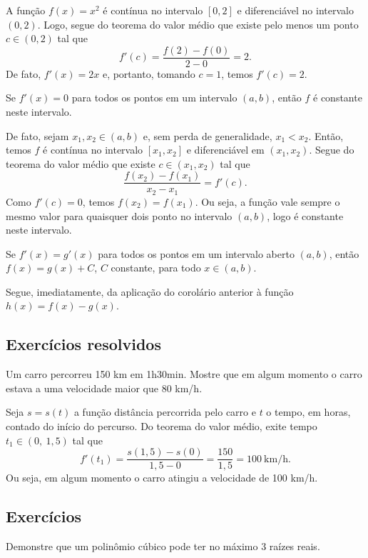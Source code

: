 \begin{ex}
  A função $f(x)=x^2$ é contínua no intervalo $[0,2]$ e diferenciável no intervalo $(0,2)$. Logo, segue do teorema do valor médio que existe pelo menos um ponto $c\in (0,2)$ tal que
  \begin{equation}
    f'(c)=\frac{f(2)-f(0)}{2-0}=2.
  \end{equation}
  De fato, $f'(x)=2x$ e, portanto, tomando $c=1$, temos $f'(c)=2$.
\end{ex}

\begin{corol}
  Se $f'(x)=0$ para todos os pontos em um intervalo $(a, b)$, então $f$ é constante neste intervalo.
\end{corol}
\begin{dem}
  De fato, sejam $x_1,x_2\in (a, b)$ e, sem perda de generalidade, $x_1<x_2$. Então, temos $f$ é contínua no intervalo $[x_1,x_2]$ e diferenciável em $(x_1,x_2)$. Segue do teorema do valor médio que existe $c\in (x_1,x_2)$ tal que
  \begin{equation}
    \frac{f(x_2)-f(x_1)}{x_2-x_1}=f'(c).
  \end{equation}
  Como $f'(c)=0$, temos $f(x_2)=f(x_1)$. Ou seja, a função vale sempre o mesmo valor para quaisquer dois ponto no intervalo $(a, b)$, logo é constante neste intervalo.
\end{dem}

\begin{corol}
  Se $f'(x)=g'(x)$ para todos os pontos em um intervalo aberto $(a,b)$, então $f(x)=g(x)+C$, $C$ constante, para todo $x\in (a,b)$.
\end{corol}
\begin{dem}
  Segue, imediatamente, da aplicação do corolário anterior à função $h(x)=f(x)-g(x)$.
\end{dem}



\subsection*{Exercícios resolvidos}

\begin{exeresol}
  Um carro percorreu 150 km em 1h30min. Mostre que em algum momento o carro estava a uma velocidade maior que 80 km/h.
\end{exeresol}
\begin{resol}
  Seja $s=s(t)$ a função distância percorrida pelo carro e $t$ o tempo, em horas, contado do início do percurso. Do teorema do valor médio, exite tempo $t_1\in (0,~1,5)$ tal que
  \begin{equation}
    f'(t_1) = \frac{s(1,5)-s(0)}{1,5-0} = \frac{150}{1,5} = 100~\text{km/h}.
  \end{equation}
  Ou seja, em algum momento o carro atingiu a velocidade de 100 km/h.
\end{resol}

\emconstrucao

\subsection*{Exercícios}

\begin{exer}
  Demonstre que um polinômio cúbico pode ter no máximo $3$ raízes reais.
\end{exer}